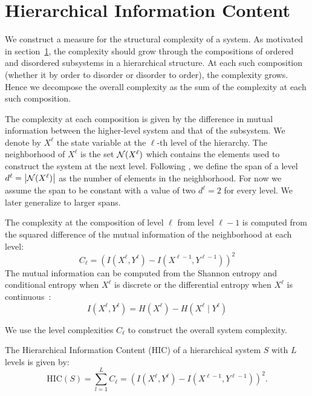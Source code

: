\section{Hierarchical Information Content}

We construct a measure for the structural complexity of a system. As motivated
in section~\ref{}, the complexity should grow through the compositions of
ordered and disordered subsystems in a hierarchical structure. At each such
composition (whether it by order to disorder or disorder to order), the
complexity grows. Hence we decompose the overall complexity as the sum of the
complexity at each such composition.

The complexity at each composition is given by the difference in mutual
information between the higher-level system and that of the subsystem. We
denote by $X^{\ell}$ the state variable at the $\ell$-th level of the
hierarchy. The neighborhood of $X^\ell$ is the set $\mathcal{N}(X^\ell)$ which
contains the elements used to construct the system at the next level. Following
\citet{simon1991architecture}, we define the span of a level $d^\ell =
\left|\mathcal{N}(X^\ell)\right|$ as the number of elements in the neighborhood. For
now we assume the span to be constant with a value of two $d^\ell = 2$ for
every level. We later generalize to larger spans.

The complexity at the composition of level $\ell$ from level $\ell -1$ is
computed from the squared difference of the mutual information of the
neighborhood at each level: 
\begin{equation}
C_\ell = \left( I(X^\ell, Y^\ell) - I(X^{\ell-1}, Y^{\ell-1}) \right)^2
\end{equation}
The mutual information can be computed from the Shannon entropy and conditional
entropy when $X^\ell$ is discrete or the differential entropy when $X^\ell$ is
continuous~\citep{cover1999elements}:
\begin{equation}
I(X^\ell, Y^\ell) = H(X^\ell) - H(X^\ell \mid Y^\ell) 
\end{equation}

We use the level complexities $C_\ell$ to construct the overall system complexity. 
\begin{definition}
\label{def:hic}
  The Hierarchical Information Content (HIC) of a hierarchical system $S$ with
  $L$ levels is given by:
  \begin{equation}
    \label{eq:hic}
    \textrm{HIC}(S) = \sum_{l=1}^L C_\ell = \left( I(X^\ell, Y^\ell) - I(X^{\ell-1}, Y^{\ell-1}) \right)^2.
  \end{equation}
\end{definition}
